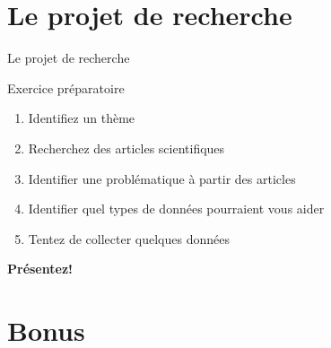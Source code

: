\documentclass[10pt]{beamer}
\begin{document}
\section{Le projet de recherche}

\begin{frame}{Le projet de recherche}
    \begin{block}{Exercice préparatoire}
    \end{block}
    \begin{enumerate}
        \item Identifiez un thème
        \item Recherchez des articles scientifiques
        \item Identifier une problématique à partir des articles
        \item Identifier quel types de données pourraient vous aider
        \item Tentez de collecter quelques données
    \end{enumerate}

\textbf{Présentez!}

\end{frame}

\section{Bonus}

\maketitle
\end{document}
